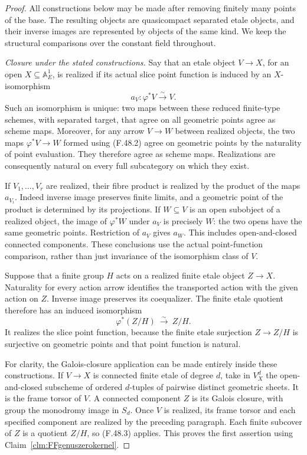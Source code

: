 \documentclass[11pt]{article}
\begin{document}
\begin{proof}
All constructions below may be made after removing
finitely many points of the base. The resulting objects
are quasicompact separated etale objects, and their
inverse images are represented by objects of the same
kind. We keep the structural comparisons over the
constant field throughout.

\emph{Closure under the stated constructions.}
Say that an etale object \(V\to X\), for an open
\(X\subseteq\mathbb A^1_E\), is realized if its
actual slice point function is induced by an
\(X\)-isomorphism
\[
                       a_V:\varphi^*V\xrightarrow{\sim}V.
                                                        \tag{F.48.2}
\]
Such an isomorphism is unique: two maps between these
reduced finite-type schemes, with separated target, that
agree on all geometric points agree as scheme maps.
Moreover, for any arrow \(V\to W\) between realized
objects, the two maps \(\varphi^*V\to W\) formed
using (F.48.2) agree on geometric points by the
naturality of point evaluation. They therefore agree
as scheme maps. Realizations are consequently natural
on every full subcategory on which they exist.

If \(V_1,\ldots,V_r\) are realized, their fibre
product is realized by the product of the maps
\(a_{V_i}\). Indeed inverse image preserves finite
limits, and a geometric point of the product is
determined by its projections. If \(W\subseteq V\)
is an open subobject of a realized object, the image of
\(\varphi^*W\) under \(a_V\) is precisely \(W\):
the two opens have the same geometric points. Restriction
of \(a_V\) gives \(a_W\). This includes open-and-closed
connected components. These conclusions use the actual
point-function comparison, rather than just invariance
of the isomorphism class of \(V\).

Suppose that a finite group \(H\) acts on a realized
finite etale object \(Z\to X\). Naturality for every
action arrow identifies the transported action with the
given action on \(Z\). Inverse image preserves its
coequalizer. The finite etale quotient therefore has
an induced isomorphism
\[
             \varphi^*(Z/H)\ \xrightarrow{\sim}\ Z/H.
                                                        \tag{F.48.3}
\]
It realizes the slice point function, because the finite
etale surjection \(Z\to Z/H\) is surjective on
geometric points and that point function is natural.

For clarity, the Galois-closure application can be made
entirely inside these constructions. If \(V\to X\)
is connected finite etale of degree \(d\), take in
\(V^d_X\) the open-and-closed subscheme of ordered
\(d\)-tuples of pairwise distinct geometric sheets.
It is the frame torsor of \(V\). A connected component
\(Z\) is its Galois closure, with group the monodromy
image in \(S_d\). Once \(V\) is realized, its frame
torsor and each specified component are realized by
the preceding paragraph. Each finite subcover of
\(Z\) is a quotient \(Z/H\), so (F.48.3) applies.
This proves the first assertion using
Claim~\ref{clm:FFgenuszerokernel}.


\end{proof}
\end{document}
